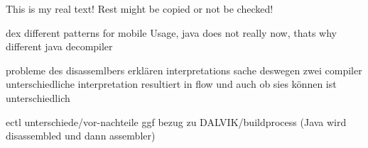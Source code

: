 This is my real text! Rest might be copied or not be checked!

dex different patterns for mobile Usage, java does not really now, thats why different java decompiler


probleme des disassemlbers erklären\newline
interpretations sache\newline
deswegen zwei compiler\newline
unterschiedliche interpretation resultiert in flow und auch ob sies können ist unterschiedlich\newline

ectl unterschiede/vor-nachteile\newline
ggf bezug zu DALVIK/buildprocess (Java wird disassembled und dann assembler)\newline
